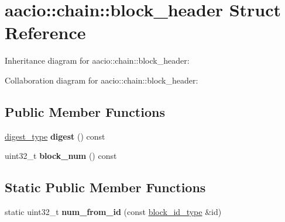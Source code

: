 \hypertarget{structaacio_1_1chain_1_1block__header}{}\section{aacio\+:\+:chain\+:\+:block\+\_\+header Struct Reference}
\label{structaacio_1_1chain_1_1block__header}


Inheritance diagram for aacio\+:\+:chain\+:\+:block\+\_\+header\+:


Collaboration diagram for aacio\+:\+:chain\+:\+:block\+\_\+header\+:
\subsection*{Public Member Functions}
\begin{DoxyCompactItemize}
\item 
\mbox{\label{structaacio_1_1chain_1_1block__header_acd1d631792698c239c931bee98a741bf}} 
\mbox{\hyperlink{classfc_1_1sha256}{digest\+\_\+type}} {\bfseries digest} () const
\item 
\mbox{\label{structaacio_1_1chain_1_1block__header_a559bbcd0575ecc8e163c1a3e45494a8b}} 
uint32\+\_\+t {\bfseries block\+\_\+num} () const
\end{DoxyCompactItemize}
\subsection*{Static Public Member Functions}
\begin{DoxyCompactItemize}
\item 
\mbox{\label{structaacio_1_1chain_1_1block__header_a9a96983b08dc13f7d765b3008d41d14a}} 
static uint32\+\_\+t {\bfseries num\+\_\+from\+\_\+id} (const \mbox{\hyperlink{classfc_1_1sha256}{block\+\_\+id\+\_\+type}} \&id)
\end{DoxyCompactItemize}
